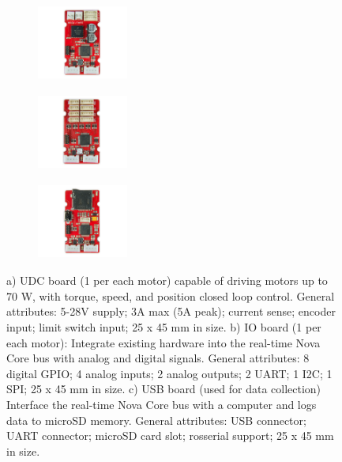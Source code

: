 \begin{figure}[ht]
\centering
 \begin{subfigure}[b]{0.3\textwidth}
 \centering
     \includegraphics[width=3cm,height=2.5cm]{images/03-foundation/udc}
	\caption{}
 \end{subfigure}
 \begin{subfigure}[b]{0.3\textwidth}
 \centering
     \includegraphics[width=3cm,height=2.5cm]{images/03-foundation/io}
	\caption{}
 \end{subfigure}
 \begin{subfigure}[b]{0.3\textwidth}
 \centering
     \includegraphics[width=3cm,height=2.5cm]{images/03-foundation/usb}
	\caption{}
	\label{fig:usb_board}
 \end{subfigure}
 \caption{a) UDC board (1 per each motor) capable of driving motors up to 70 W, with torque, speed, and position closed loop control. General attributes: 5-28V supply; 3A max (5A peak); current sense; encoder input; limit switch input; 25 x 45 mm in size. b) IO board (1 per each motor): Integrate existing hardware into the real-time Nova Core bus with analog and digital signals. General attributes: 8 digital GPIO;  4 analog inputs; 2 analog outputs; 2 UART; 1 I2C; 1 SPI; 25 x 45 mm in size. c) USB board (used for data collection) Interface the real-time Nova Core bus with a computer and logs data to microSD memory. General attributes: USB connector;  UART connector; microSD card slot; rosserial support; 25 x 45 mm in size.}
 \label{fig:boards}
\end{figure}

